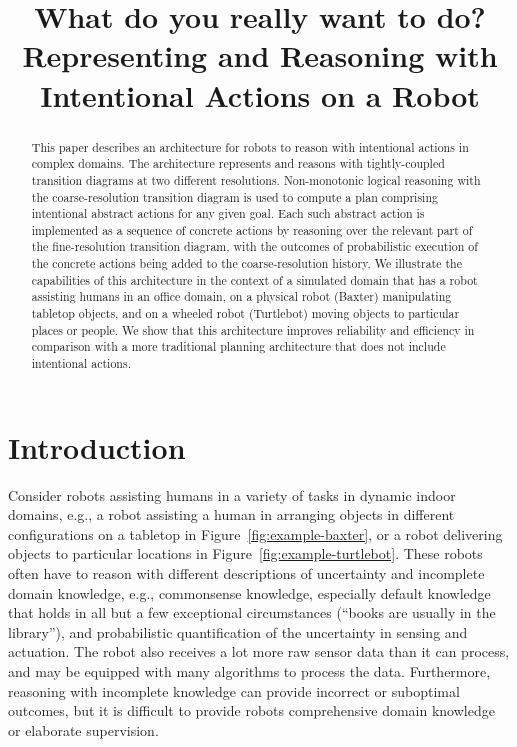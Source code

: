 \documentclass[letterpaper, 10 pt, conference]{article}  %
\title{\LARGE \bf What do you really want to do? Representing and
  Reasoning with Intentional Actions on a Robot}
\begin{document}
\maketitle
\thispagestyle{empty}
\pagestyle{empty}


\begin{abstract}
  This paper describes an architecture for robots to reason with
  intentional actions in complex domains. The architecture represents
  and reasons with tightly-coupled transition diagrams at two
  different resolutions. Non-monotonic logical reasoning with the
  coarse-resolution transition diagram is used to compute a plan
  comprising intentional abstract actions for any given goal. Each
  such abstract action is implemented as a sequence of concrete
  actions by reasoning over the relevant part of the fine-resolution
  transition diagram, with the outcomes of probabilistic execution of
  the concrete actions being added to the coarse-resolution history.
  We illustrate the capabilities of this architecture in the context
  of a simulated domain that has a robot assisting humans in an office
  domain, on a physical robot (Baxter) manipulating tabletop objects,
  and on a wheeled robot (Turtlebot) moving objects to particular
  places or people. We show that this architecture improves
  reliability and efficiency in comparison with a more traditional
  planning architecture that does not include intentional actions.
\end{abstract}


\section{Introduction}
Consider robots assisting humans in a variety of tasks in dynamic
indoor domains, e.g., a robot assisting a human in arranging objects
in different configurations on a tabletop in
Figure~\ref{fig:example-baxter}, or a robot delivering objects to
particular locations in Figure~\ref{fig:example-turtlebot}. These
robots often have to reason with different descriptions of uncertainty
and incomplete domain knowledge, e.g., commonsense knowledge,
especially default knowledge that holds in all but a few exceptional
circumstances (``books are usually in the library''), and
probabilistic quantification of the uncertainty in sensing and
actuation. The robot also receives a lot more raw sensor data than it
can process, and may be equipped with many algorithms to process the
data. Furthermore, reasoning with incomplete knowledge can provide
incorrect or suboptimal outcomes, but it is difficult to provide
robots comprehensive domain knowledge or elaborate supervision.
\end{document}
